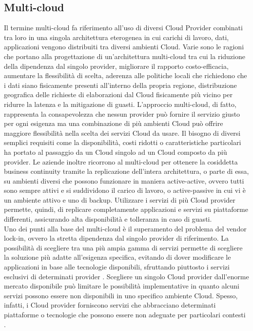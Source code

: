 \subsection{Multi-cloud}
Il termine multi-cloud fa riferimento all’uso di diversi Cloud Provider combinati tra loro in una singola architettura eterogenea in cui carichi di lavoro, dati, applicazioni vengono distribuiti tra diversi ambienti Cloud. Varie sono le ragioni che portano alla progettazione di un’architettura multi-cloud tra cui la riduzione della dipendenza dal singolo provider, migliorare il rapporto costo-efficacia, aumentare la flessibilità di scelta, aderenza alle politiche locali che richiedono che i dati siano fisicamente presenti all’interno della propria regione, distribuzione geografica delle richieste di elaborazioni dal Cloud fisicamente più vicino per ridurre la latenza e la mitigazione di guasti. L’approccio multi-cloud, di fatto, rappresenta la consapevolezza che nessun provider può fornire il servizio giusto per ogni esigenza ma una combinazione di più ambienti Cloud può offrire maggiore flessibilità nella scelta dei servizi Cloud da usare.
Il bisogno di diversi semplici requisiti come la disponibilità, costi ridotti o caratteristiche particolari ha portato al passaggio da un Cloud singolo ad un Cloud composto da più provider. Le aziende inoltre ricorrono al multi-cloud per ottenere la cosiddetta business continuity tramite la replicazione dell’intera architettura, o parte di essa, su ambienti diversi che possono funzionare in maniera active-active, ovvero tutti sono sempre attivi e si suddividono il carico di lavoro, o active-passive in cui vi è un ambiente attivo e uno di backup. Utilizzare i servizi di più Cloud provider permette, quindi, di replicare completamente applicazioni e servizi su piattaforme differenti, assicurando alta disponibilità e tolleranza in caso di guasti. \\
Uno dei punti alla base del multi-cloud è il superamento del problema del vendor lock-in, ovvero la stretta dipendenza dal singolo provider di riferimento. La possibilità di scegliere tra una più ampia gamma di servizi permette di scegliere la soluzione più adatte all’esigenza specifica, evitando di dover modificare le applicazioni in base alle tecnologie disponibili, sfruttando piuttosto i servizi esclusivi di determinati provider \cite{MultiCloud2}. Scegliere un singolo Cloud provider dall’enorme mercato disponibile può limitare le possibilità implementative in quanto alcuni servizi possono essere non disponibili in uno specifico ambiente Cloud. Spesso, infatti, i Cloud provider forniscono servizi che abbracciano determinati piattaforme o tecnologie che possono essere non adeguate per particolari contesti \cite{MultiCloud}. \\
